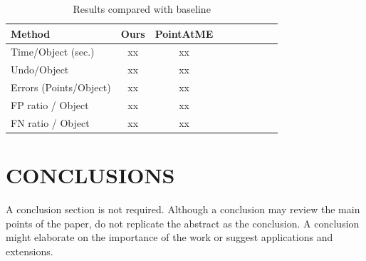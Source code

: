 \documentclass[letterpaper, 10 pt, conference]{ieeeconf}  %
\begin{document}
\begin{table}[h]
	\centering
	\caption{Results compared with baseline}
	\label{tab:metrics}
	\begin{tabular}{|l|c|c|c|c||c|c|c|c|}
		\hline
		\textbf{Method} & \textbf{Ours} & \textbf{PointAtME\cite{pointatme}} \\
		\hline
		\hline
		Time/Object (sec.) & xx & xx\\
		\hline
		Undo/Object & xx & xx\\
		\hline
		Errors (Points/Object) & xx & xx\\
		\hline
		FP ratio / Object & xx & xx\\
		\hline
		FN ratio / Object & xx & xx\\
		\hline
	\end{tabular}
\end{table}


\section{CONCLUSIONS}
\label{conclusions}
A conclusion section is not required. Although a conclusion may review the main points of the paper, do not replicate the abstract as the conclusion. A conclusion might elaborate on the importance of the work or suggest applications and extensions.

\addtolength{\textheight}{-12cm}   %




\end{document}
